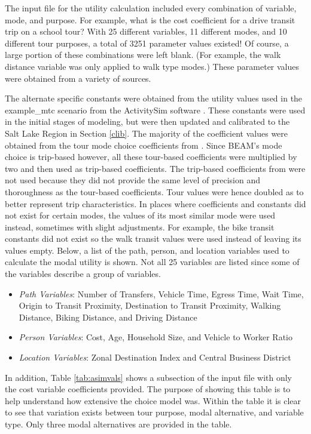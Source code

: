 \documentclass[3p, authoryear, review]{elsarticle} %
\providecommand{\tightlist}{%
  \setlength{\itemsep}{0pt}\setlength{\parskip}{0pt}}
\begin{document}
The input file for the utility calculation included every combination of variable, mode, and purpose. For example, what is the cost coefficient for a drive transit trip on a school tour? With 25 different variables, 11 different modes, and 10 different tour purposes, a total of 3251 parameter values existed! Of course, a large portion of these combinations were left blank. (For example, the walk distance variable was only applied to walk type modes.) These parameter values were obtained from a variety of sources.

The alternate specific constants were obtained from the utility values used in the example\_mtc scenario from the ActivitySim software \citep{asim}. These constants were used in the initial stages of modeling, but were then updated and calibrated to the Salt Lake Region in Section \ref{clib}. The majority of the coefficient values were obtained from the tour mode choice coefficients from \citet{mtc12}. Since BEAM's mode choice is trip-based however, all these tour-based coefficients were multiplied by two and then used as trip-based coefficients. The trip-based coefficients from \citet{mtc12} were not used because they did not provide the same level of precision and thoroughness as the tour-based coefficients. Tour values were hence doubled as to better represent trip characteristics. In places where coefficients and constants did not exist for certain modes, the values of its most similar mode were used instead, sometimes with slight adjustments. For example, the bike transit constants did not exist so the walk transit values were used instead of leaving its values empty. Below, a list of the path, person, and location variables used to calculate the modal utility is shown. Not all 25 variables are listed since some of the variables describe a group of variables.

\begin{itemize}
\tightlist
\item
  \emph{Path Variables}: Number of Transfers, Vehicle Time, Egress Time, Wait Time, Origin to Transit Proximity, Destination to Transit Proximity, Walking Distance, Biking Distance, and Driving Distance
\item
  \emph{Person Variables}: Cost, Age, Household Size, and Vehicle to Worker Ratio
\item
  \emph{Location Variables}: Zonal Destination Index and Central Business District
\end{itemize}

In addition, Table \ref{tab:asimvals} shows a subsection of the input file with only the cost variable coefficients provided. The purpose of showing this table is to help understand how extensive the choice model was. Within the table it is clear to see that variation exists between tour purpose, modal alternative, and variable type. Only three modal alternatives are provided in the table.
\end{document}
